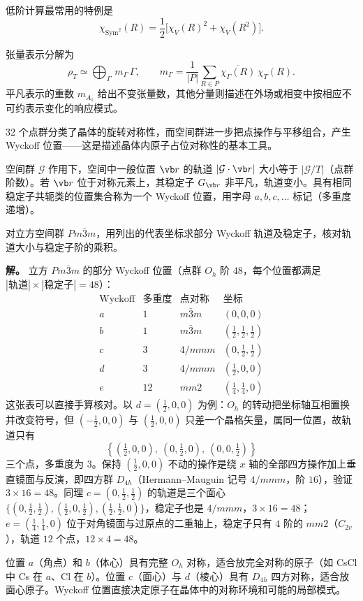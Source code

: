 低阶计算最常用的特例是
\[
\chi_{\mathrm{Sym}^2}(R)
=\frac12\bigl[\chi_V(R)^2+\chi_V(R^2)\bigr].
\]
\begin{proposition}[张量表示的不可约分解]
\label{prop:tensor-irrep-decomposition}
张量表示分解为
\[
\rho_T\simeq\bigoplus_\Gamma\,m_\Gamma\,\Gamma,\qquad m_\Gamma=\frac1{|P|}\sum_{R\in P}\overline{\chi_\Gamma(R)}\,\chi_T(R).
\]
平凡表示的重数 $m_{A_1}$ 给出不变张量数，其他分量则描述在外场或相变中按相应不可约表示变化的响应模式。
\end{proposition}

32 个点群分类了晶体的旋转对称性，而空间群进一步把点操作与平移组合，产生 Wyckoff 位置——这是描述晶体内原子占位对称性的基本工具。

\begin{definition}[Wyckoff 位置]
空间群 $\mathcal G$ 作用下，空间中一般位置 $\vb r$ 的轨道 $|\mathcal G\cdot\vb r|$ 大小等于 $|\mathcal G/T|$（点群阶数）。若 $\vb r$ 位于对称元素上，其稳定子 $G_{\vb r}$ 非平凡，轨道变小。具有相同稳定子共轭类的位置集合称为一个 Wyckoff 位置，用字母 $a,b,c,\dots$ 标记（多重度递增）。
\end{definition}

\begin{example}
对立方空间群 $Pm\bar3m$，用列出的代表坐标求部分 Wyckoff 轨道及稳定子，核对轨道大小与稳定子阶的乘积。

\textbf{解。} 立方 $Pm\bar3m$ 的部分 Wyckoff 位置（点群 $O_h$ 阶 $48$，每个位置都满足 $|\text{轨道}|\times|\text{稳定子}|=48$）：
\[
\begin{array}{c|c|c|l}
\text{Wyckoff} & \text{多重度} & \text{点对称} & \text{坐标}\\\hline
a&1&m\bar3m&(0,0,0)\\
b&1&m\bar3m&(\tfrac12,\tfrac12,\tfrac12)\\
c&3&4/mmm&(0,\tfrac12,\tfrac12)\\
d&3&4/mmm&(\tfrac12,0,0)\\
e&12&mm2&(\tfrac14,\tfrac14,0)
\end{array}
\]
这张表可以直接手算核对。以 $d=(\tfrac12,0,0)$ 为例：$O_h$ 的转动把坐标轴互相置换并改变符号，但 $(-\tfrac12,0,0)$ 与 $(\tfrac12,0,0)$ 只差一个晶格矢量，属同一位置，故轨道只有
\[
\left\{(\tfrac12,0,0),\ (0,\tfrac12,0),\ (0,0,\tfrac12)\right\}
\]
三个点，多重度为 $3$。保持 $(\tfrac12,0,0)$ 不动的操作是绕 $x$ 轴的全部四方操作加上垂直镜面与反演，即四方群 $D_{4h}$（Hermann--Mauguin 记号 $4/mmm$，阶 $16$），验证 $3\times16=48$。同理 $c=(0,\tfrac12,\tfrac12)$ 的轨道是三个面心 $\{(0,\tfrac12,\tfrac12),(\tfrac12,0,\tfrac12),(\tfrac12,\tfrac12,0)\}$，稳定子也是 $4/mmm$，$3\times16=48$；$e=(\tfrac14,\tfrac14,0)$ 位于对角镜面与过原点的二重轴上，稳定子只有 $4$ 阶的 $mm2$（$C_{2v}$），轨道 $12$ 个点，$12\times4=48$。

位置 $a$（角点）和 $b$（体心）具有完整 $O_h$ 对称，适合放完全对称的原子（如 CsCl 中 Cs 在 $a$、Cl 在 $b$）。位置 $c$（面心）与 $d$（棱心）具有 $D_{4h}$ 四方对称，适合放面心原子。Wyckoff 位置直接决定原子在晶体中的对称环境和可能的局部模式。
\end{example}

